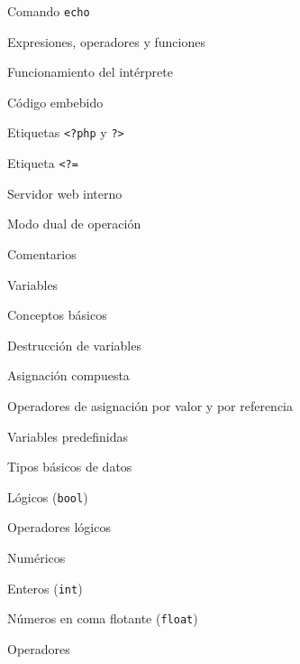 \begin{longenum}
\begin{longenum}
\begin{longenum}
\begin{longenum}
                \item Comando \texttt{echo}
            \end{longenum}
            \item Expresiones, operadores y funciones
        \end{longenum}
        \item Funcionamiento del intérprete
        \begin{longenum}
            \item Código embebido
            \begin{longenum}
                \item Etiquetas \texttt{<?php} y \texttt{?>}
                \item Etiqueta \texttt{<?=}
                \item Servidor web  interno
            \end{longenum}
            \item Modo dual de operación
            \item Comentarios
        \end{longenum}
        \item Variables
        \begin{longenum}
            \item Conceptos básicos
            \item Destrucción de variables
            \item Asignación compuesta
            \item Operadores de asignación por valor y por referencia
            \item Variables predefinidas
        \end{longenum}
        \item Tipos básicos de datos
        \begin{longenum}
            \item Lógicos (\texttt{bool})
            \begin{longenum}
                \item Operadores lógicos
            \end{longenum}
            \item Numéricos
            \begin{longenum}
                \item Enteros (\texttt{int})
                \item Números en coma flotante (\texttt{float})
                \item Operadores

\end{longenum}
\end{longenum}
\end{longenum}
\end{longenum}

